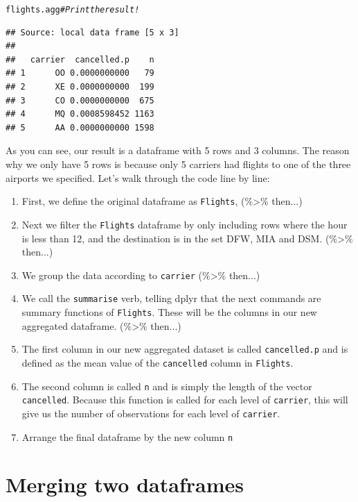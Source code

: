 \documentclass{tufte-book}\usepackage[]{graphicx}\usepackage[]{color}
\makeatletter
\newcommand{\hlcom}[1]{\textcolor[rgb]{0.678,0.584,0.686}{\textit{#1}}}%
\newcommand{\hlstd}[1]{\textcolor[rgb]{0.345,0.345,0.345}{#1}}%
\newenvironment{kframe}{%
 \def\at@end@of@kframe{}%
 \ifinner\ifhmode%
  \def\at@end@of@kframe{\end{minipage}}%
  \begin{minipage}{\columnwidth}%
 \fi\fi%
 \def\FrameCommand##1{\hskip\@totalleftmargin \hskip-\fboxsep
 \colorbox{shadecolor}{##1}\hskip-\fboxsep
     \hskip-\linewidth \hskip-\@totalleftmargin \hskip\columnwidth}%
 \MakeFramed {\advance\hsize-\width
   \@totalleftmargin\z@ \linewidth\hsize
   \@setminipage}}%
 {\par\unskip\endMakeFramed%
 \at@end@of@kframe}
\newenvironment{knitrout}{}{} %
\makeatother
\begin{document}
\begin{footnotesize}
\begin{footnotesize}
\begin{knitrout}
\begin{kframe}
\begin{alltt}
\hlstd{flights.agg} \hlcom{# Print the result!}
\end{alltt}
\begin{verbatim}
## Source: local data frame [5 x 3]
## 
##   carrier  cancelled.p    n
## 1      OO 0.0000000000   79
## 2      XE 0.0000000000  199
## 3      CO 0.0000000000  675
## 4      MQ 0.0008598452 1163
## 5      AA 0.0000000000 1598
\end{verbatim}
\end{kframe}
\end{knitrout}
\end{footnotesize}

As you can see, our result is a dataframe with 5 rows and 3 columns. The reason why we only have 5 rows is because only 5 carriers had flights to one of the three airports we specified. Let's walk through the code line by line:

\begin{enumerate}

  \item First, we define the original dataframe as \texttt{Flights}, (\%>\% then...)
  \item Next we filter the \texttt{Flights} dataframe by only including rows where the hour is less than 12, and the destination is in the set DFW, MIA and DSM. (\%>\% then...)
  \item We group the data according to \texttt{carrier} (\%>\% then...)
  \item We call the \texttt{summarise} verb, telling dplyr that the next commands are summary functions of \texttt{Flights}. These will be the columns in our new aggregated dataframe. (\%>\% then...)
  \item The first column in our new aggregated dataset is called \texttt{cancelled.p} and is defined as the mean value of the \texttt{cancelled} column in \texttt{Flights}. 
  \item The second column is called \texttt{n} and is simply the length of the vector \texttt{cancelled}. Because this function is called for each level of \texttt{carrier}, this will give us the number of observations for each level of \texttt{carrier}.
    \item Arrange the final dataframe by the new column \texttt{n}
  
\end{enumerate}


\section{Merging two dataframes}


\end{footnotesize}
\end{document}
